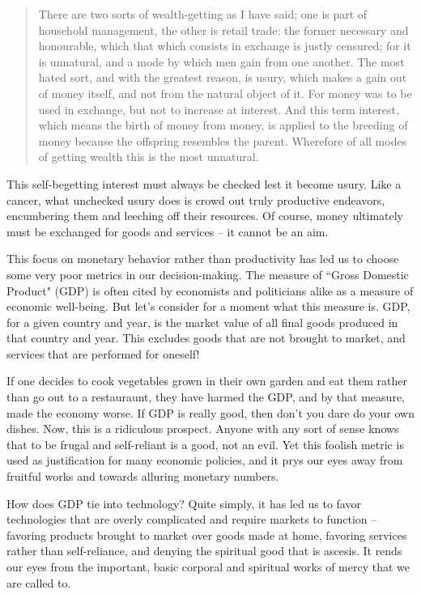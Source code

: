 \documentclass[letterpaper]{article}
\begin{document}
    \begin{quote}
      There are two sorts of wealth-getting as I have said; one is part of household management, the other is retail trade: the former necessary and honourable, which that which consists in exchange is justly censured; for it is unnatural, and a mode by which men gain from one another. The most hated sort, and with the greatest reason, is usury, which makes a gain out of money itself, and not from the natural object of it. For money was to be used in exchange, but not to increase at interest. And this term interest, which means the birth of money from money, is applied to the breeding of money because the offspring resembles the parent. Wherefore of all modes of getting wealth this is the most unnatural.
    \end{quote}

    This self-begetting interest must always be checked lest it become usury. Like a cancer, what unchecked usury does is crowd out truly productive endeavors, encumbering them and leeching off their resources. Of course, money ultimately must be exchanged for goods and services -- it cannot be an aim.

    This focus on monetary behavior rather than productivity has led us to choose some very poor metrics in our decision-making. The measure of ``Gross Domestic Product" (GDP) is often cited by economists and politicians alike as a measure of economic well-being. But let's consider for a moment what this measure is. GDP, for a given country and year, is the market value of all final goods produced in that country and year. This excludes goods that are not brought to market, and services that are performed for oneself!

    If one decides to cook vegetables grown in their own garden and eat them rather than go out to a restauraunt, they have harmed the GDP, and by that measure, made the economy worse. If GDP is really good, then don't you dare do your own dishes. Now, this is a ridiculous prospect. Anyone with any sort of sense knows that to be frugal and self-reliant is a good, not an evil. Yet this foolish metric is used as justification for many economic policies, and it prys our eyes away from fruitful works and towards alluring monetary numbers.

    How does GDP tie into technology? Quite simply, it has led us to favor technologies that are overly complicated and require markets to function -- favoring products brought to market over goods made at home, favoring services rather than self-reliance, and denying the spiritual good that is ascesis. It rends our eyes from the important, basic corporal and spiritual works of mercy that we are called to.
\end{document}
